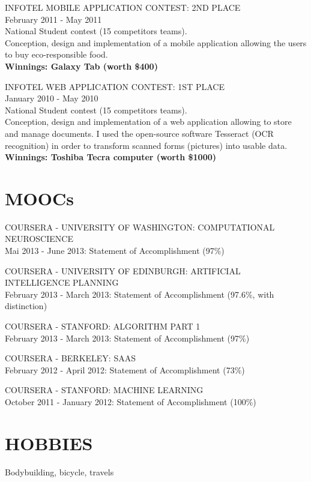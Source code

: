 \documentclass[11pt]{res} %
\begin{document}
\begin{resume}
INFOTEL MOBILE APPLICATION CONTEST: 2ND PLACE \\
February 2011 - May 2011 \\
National Student contest (15 competitors teams). \\
Conception, design and implementation of a mobile application allowing the users to buy eco-responsible food. \\
{\bf Winnings: Galaxy Tab (worth \$400)}

INFOTEL WEB APPLICATION CONTEST: 1ST PLACE \\
January 2010 - May 2010 \\
National Student contest (15 competitors teams). \\
Conception, design and implementation of a web application allowing to store and manage documents. I used
the open-source software Tesseract (OCR recognition) in order to transform scanned forms (pictures) into usable data. \\ 
{\bf Winnings: Toshiba Tecra computer (worth \$1000)}

\section{MOOCs} 
 
COURSERA - UNIVERSITY OF WASHINGTON: COMPUTATIONAL NEUROSCIENCE \\
Mai 2013 - June 2013: Statement of Accomplishment (97\%)

COURSERA - UNIVERSITY OF EDINBURGH: ARTIFICIAL INTELLIGENCE PLANNING \\
February 2013 - March 2013: Statement of Accomplishment (97.6\%, with distinction)

COURSERA - STANFORD: ALGORITHM PART 1 \\
February 2013 - March 2013: Statement of Accomplishment (97\%)

COURSERA - BERKELEY: SAAS \\
February 2012 - April 2012: Statement of Accomplishment (73\%)

COURSERA - STANFORD: MACHINE LEARNING \\
October 2011 - January 2012: Statement of Accomplishment (100\%)
 
\section{HOBBIES} 
 
Bodybuilding, bicycle, travels
 

\end{resume}
\end{document}
